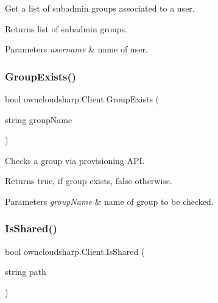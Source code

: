 Get a list of subadmin groups associated to a user. 

\begin{DoxyReturn}{Returns}
list of subadmin groups.
\end{DoxyReturn}

\begin{DoxyParams}{Parameters}
{\em username} & name of user.\\
\hline
\end{DoxyParams}
\mbox{\label{classowncloudsharp_1_1_client_a0eb9c35f345906e16175605b0cc08ade}} 
\subsubsection{\texorpdfstring{Group\+Exists()}{GroupExists()}}
{\footnotesize\ttfamily bool owncloudsharp.\+Client.\+Group\+Exists (\begin{DoxyParamCaption}\item[{string}]{group\+Name }\end{DoxyParamCaption})}



Checks a group via provisioning A\+PI. 

\begin{DoxyReturn}{Returns}
{\ttfamily true}, if group exists, {\ttfamily false} otherwise.
\end{DoxyReturn}

\begin{DoxyParams}{Parameters}
{\em group\+Name} & name of group to be checked.\\
\hline
\end{DoxyParams}
\mbox{\label{classowncloudsharp_1_1_client_a241b88019805ddd87e8d596a6cf6c7a9}} 
\subsubsection{\texorpdfstring{Is\+Shared()}{IsShared()}}
{\footnotesize\ttfamily bool owncloudsharp.\+Client.\+Is\+Shared (\begin{DoxyParamCaption}\item[{string}]{path }\end{DoxyParamCaption})}



